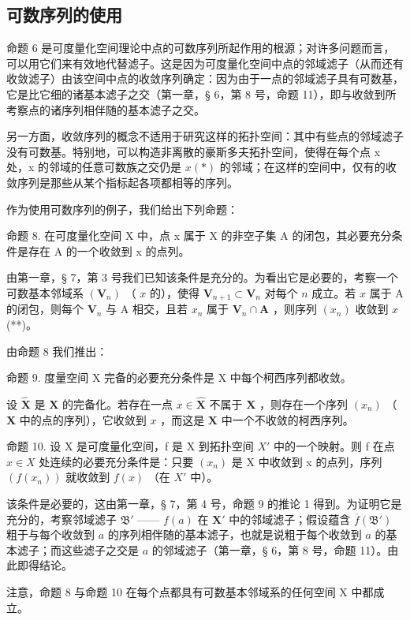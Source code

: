 \subsection{可数序列的使用}

命题 6 是可度量化空间理论中点的可数序列所起作用的根源；对许多问题而言，可以用它们来有效地代替滤子。这是因为可度量化空间中点的邻域滤子（从而还有收敛滤子）由该空间中点的收敛序列确定：因为由于一点的邻域滤子具有可数基，它是比它细的诸基本滤子之交（第一章，§ 6，第 8 号，命题 11），即与收敛到所考察点的诸序列相伴随的基本滤子之交。

另一方面，收敛序列的概念不适用于研究这样的拓扑空间：其中有些点的邻域滤子没有可数基。特别地，可以构造非离散的豪斯多夫拓扑空间，使得在每个点 x 处，x 的邻域的任意可数族之交仍是 \(x (*)\) 的邻域；在这样的空间中，仅有的收敛序列是那些从某个指标起各项都相等的序列。

作为使用可数序列的例子，我们给出下列命题：

命题 8. 在可度量化空间 X 中，点 x 属于 X 的非空子集 A 的闭包，其必要充分条件是存在 A 的一个收敛到 x 的点列。

由第一章，§ 7，第 3 号我们已知该条件是充分的。为看出它是必要的，考察一个可数基本邻域系 \((\mathbf{V}_n)\) （ \(x\) 的），使得 \(\mathbf{V}_{n+1} \subset \mathbf{V}_n\) 对每个 \(n\) 成立。若 \(x\) 属于 A 的闭包，则每个 \(\mathbf{V}_n\) 与 A 相交，且若 \(x_n\) 属于 \(\mathbf{V}_n \cap \mathbf{A}\) ，则序列 \((x_n)\) 收敛到 \(x\) (**)。

由命题 8 我们推出：

命题 9. 度量空间 X 完备的必要充分条件是 X 中每个柯西序列都收敛。

设 \(\hat{\mathbf{X}}\) 是 \(\mathbf{X}\) 的完备化。若存在一点 \(x \in \hat{\mathbf{X}}\) 不属于 \(\mathbf{X}\) ，则存在一个序列 \((x_n)\) （\(\mathbf{X}\) 中的点的序列），它收敛到 \(x\) ，而这是 \(\mathbf{X}\) 中一个不收敛的柯西序列。

命题 10. 设 X 是可度量化空间，f 是 X 到拓扑空间 \(X'\) 中的一个映射。则 f 在点 \(x \in X\) 处连续的必要充分条件是：只要 \((x_n)\) 是 X 中收敛到 x 的点列，序列 \((f(x_n))\) 就收敛到 \(f(x)\) （在 \(X'\) 中）。

该条件是必要的，这由第一章，§ 7，第 4 号，命题 9 的推论 1 得到。为证明它是充分的，考察邻域滤子 \(\mathfrak{B}'\) —— \(f(a)\) 在 \(\mathbf{X}'\) 中的邻域滤子；假设蕴含 \(\overline{f}(\mathfrak{B}')\) 粗于与每个收敛到 \(a\) 的序列相伴随的基本滤子，也就是说粗于每个收敛到 \(a\) 的基本滤子；而这些滤子之交是 \(a\) 的邻域滤子（第一章，§ 6，第 8 号，命题 11）。由此即得结论。

注意，命题 8 与命题 10 在每个点都具有可数基本邻域系的任何空间 X 中都成立。


